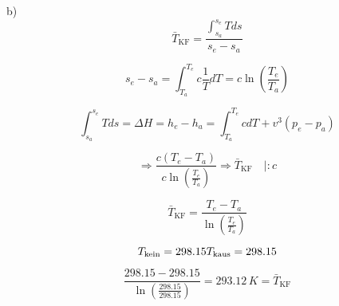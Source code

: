 b) 
\[
\bar{T}_{\text{KF}} = \frac{\int_{s_a}^{s_e} T ds}{s_e - s_a}
\]

\[
s_e - s_a = \int_{T_a}^{T_e} c \frac{1}{T} dT = c \ln \left( \frac{T_e}{T_a} \right)
\]

\[
\int_{s_a}^{s_e} T ds = \Delta H = h_e - h_a = \int_{T_a}^{T_e} c dT + v^3 \left( p_e - p_a \right)
\]

\[
\Rightarrow \frac{c \left( T_e - T_a \right)}{c \ln \left( \frac{T_e}{T_a} \right)} \Rightarrow \bar{T}_{\text{KF}} \quad | : c
\]

\[
\bar{T}_{\text{KF}} = \frac{T_e - T_a}{\ln \left( \frac{T_e}{T_a} \right)}
\]

\[
T_{\text{kein}} = 298.15 \\
T_{\text{kaus}} = 298.15
\]

\[
\frac{298.15 - 298.15}{\ln \left( \frac{298.15}{298.15} \right)} = 293.12\,K = \bar{T}_{\text{KF}}
\]